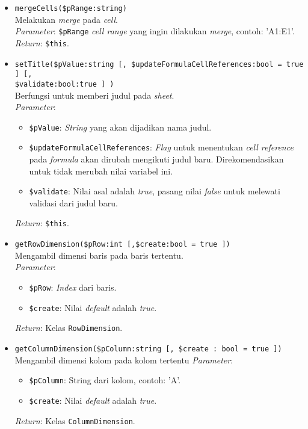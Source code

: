 \begin{itemize}
	\item \texttt{mergeCells(\$pRange:string)} \\ 
	Melakukan \textit{merge} pada \textit{cell}. \\ 
	\textit{Parameter}: \texttt{\$pRange} \textit{cell range} yang ingin dilakukan \textit{merge}, contoh: 'A1:E1'. \\
	\textit{Return}: \texttt{\$this}.
	\item \texttt{setTitle(\$pValue:string [, \$updateFormulaCellReferences:bool = true ] [, \\ \$validate:bool:true ] )}\\
	 Berfungsi untuk memberi judul pada \textit{sheet}. \\
	 \textit{Parameter}:
	 \begin{itemize}
	 	\item \texttt{\$pValue}: \textit{String} yang akan dijadikan nama judul.
	 	\item \texttt{\$updateFormulaCellReferences}: \textit{Flag} untuk menentukan \textit{cell reference} pada \textit{formula} akan dirubah mengikuti judul baru. Direkomendasikan untuk tidak merubah nilai variabel ini.
	 	\item \texttt{\$validate}: Nilai asal adalah \textit{true}, pasang nilai \textit{false} untuk melewati validasi dari judul baru.
	 \end{itemize}
 	\textit{Return}: \texttt{\$this}.
	\item \texttt{getRowDimension(\$pRow:int [,\$create:bool = true ])} \\ 
	Mengambil dimensi baris pada baris tertentu. \\
	\textit{Parameter}: 
	\begin{itemize}
		\item \texttt{\$pRow}: \textit{Index} dari baris.
		\item \texttt{\$create}: Nilai \textit{default} adalah \textit{true}.
	\end{itemize}
	\textit{Return}: Kelas \texttt{RowDimension}.
	\item \texttt{getColumnDimension(\$pColumn:string [, \$create : bool = true ])} \\
	Mengambil dimensi kolom pada kolom tertentu
	\textit{Parameter}:
	\begin{itemize}
		\item \texttt{\$pColumn}: String dari kolom, contoh: 'A'.
		\item \texttt{\$create}: Nilai \textit{default} adalah \textit{true}.
	\end{itemize}
	\textit{Return}: Kelas \texttt{ColumnDimension}.
\end{itemize}

